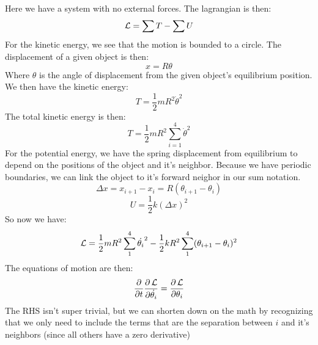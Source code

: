 Here we have a system with no external forces. The lagrangian is then:
\begin{equation}
    \operatorname{\mathcal{L}} = \sum T - \sum U
\end{equation}
For the kinetic energy, we see that the motion is bounded to a circle. The displacement of a given object is then:
\begin{equation}
    x = R\theta
\end{equation}
Where $\theta$ is the angle of displacement from the given object's equilibrium position. We then have the kinetic energy:
\begin{equation}
    T = \frac{1}{2}m R^2 \dot{\theta}^2
\end{equation}
The total kinetic energy is then:
\begin{equation}
    T = \frac{1}{2}m R^2\sum_{i=1}^{4} \dot{\theta}^2
\end{equation}
For the potential energy, we have the spring displacement from equilibrium to depend on the positions of the object and it's neighbor. Because we have periodic boundaries, we can link the object to it's forward neighor in our sum notation.
\begin{equation}
    \Delta x = x_{i+1} - x_i  = R(\theta_{i+1} - \theta_i)
\end{equation}
\begin{equation}
    U = \frac{1}{2}k (\Delta x)^2
\end{equation}
So now we have:
\begin{equation}
    \operatorname{\mathcal{L}} = \frac{1}{2}mR^2 \sum_{1}^{4}\dot{\theta_i}^2 - \frac{1}{2}kR^2\sum_{1}^{4} (\theta_{i+1} - \theta_i)^2
\end{equation}
The equations of motion are then:
\begin{equation}
    \pdv{}{t}\pdv{\operatorname{\mathcal{L}}}{\dot{\theta_i}} = \pdv{\operatorname{\mathcal{L}}}{\theta_i}
\end{equation}
The RHS isn't super trivial,  but we can shorten down on the math by recognizing that we only need to include the terms that are the separation between $i$ and it's neighbors (since all others have a zero derivative)
